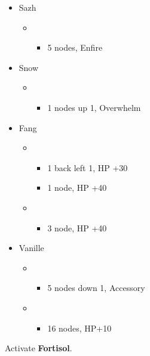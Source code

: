 	\begin{menu}
		\begin{itemize}
			\crystarium
			\begin{itemize}
				\item Sazh
				      \begin{itemize}
					      \item \syn
					            \begin{itemize}
						            \item 5 nodes, Enfire
					            \end{itemize}
				      \end{itemize}
				\item Snow
				      \begin{itemize}
					      \item \rav
					            \begin{itemize}
						            \item 1 nodes up 1, Overwhelm
					            \end{itemize}
				      \end{itemize}
				\item Fang
				      \begin{itemize}
					      \item \sab
					            \begin{itemize}
						            \item 1 back left 1, HP +30
						            \item 1 node, HP +40
					            \end{itemize}
					      \item \sen
					            \begin{itemize}
						            \item 3 node, HP +40
					            \end{itemize}
				      \end{itemize}
				\item Vanille
				      \begin{itemize}
					      \item \sab
					            \begin{itemize}
						            \item 5 nodes down 1, Accessory
					            \end{itemize}
					      \item \med
					            \begin{itemize}
						            \item 16 nodes, HP+10
					            \end{itemize}
				      \end{itemize}
			\end{itemize}

		\end{itemize}
	\end{menu}
	 Activate \textbf{Fortisol}.
	\vfill

